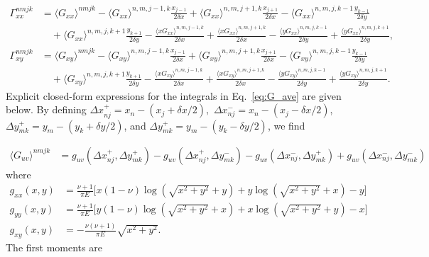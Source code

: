 \documentclass[aps,prl,reprint,groupedaddress,twocolumn]{revtex4-1}
\begin{document}
\begin{appendix}
\begin{align}
\Gamma_{xx}^{nmjk} & = \langle G_{xx} \rangle^{nmjk} - 
\langle G_{xx}\rangle^{n,m,j-1,k}\frac{x_{j-1}}{2\delta x}
+ \langle G_{xx} \rangle^{n,m,j+1,k}\frac{x_{j+1}}{2\delta x} 
-  \langle G_{xx} \rangle^{n,m,j,k-1}\frac{y_{k-1}}{2\delta y}  \nonumber\\
\: &\quad + \langle G_{xx} \rangle^{n,m,j,k+1}\frac{y_{k+1}}{2\delta y} 
-\frac{\langle xG_{xx} \rangle^{n,m,j-1,k}}{2\delta x}
+\frac{\langle xG_{xx} \rangle^{n,m,j+1,k}}{2\delta x} 
- \frac{\langle yG_{xx} \rangle^{n,m,j,k-1}}{2\delta y} 
+\frac{\langle yG_{xx} \rangle^{n,m,j,k+1}}{2\delta y}, 
\label{eq:linearsystemX}\tag{B3}
\end{align}
\begin{align}
\Gamma_{xy}^{nmjk} & =  \langle G_{xy} \rangle^{nmjk} 
- \langle G_{xy} \rangle^{n,m,j-1,k}\frac{x_{j-1}}{2\delta x}
+\langle G_{xy} \rangle^{n,m,j+1,k}\frac{x_{j+1}}{2\delta x} 
- \langle G_{xy} \rangle^{n,m,j,k-1}\frac{y_{k-1}}{2\delta y} \nonumber\\
\: & \quad+\langle G_{xy} \rangle^{n,m,j,k+1}\frac{y_{k+1}}{2\delta y}  
-\frac{\langle xG_{xy} \rangle^{n,m,j-1,k}}{2\delta x}+
\frac{\langle xG_{xy} \rangle^{n,m,j+1,k}}{2\delta x} 
- \frac{\langle yG_{xy} \rangle^{n,m,j,k-1}}{2\delta y} 
+\frac{\langle yG_{xy} \rangle^{n,m,j,k+1}}{2\delta y}.
\label{eq:linearsystemY}\tag{B4}
\end{align}
%
Explicit closed-form expressions for the integrals in
Eq.~\ref{eq:G_ave} are given below. By defining $\Delta x_{nj}^+ = x_n -
(x_j+\delta x/2),$ $\Delta x_{nj}^- = x_n - (x_j-\delta x/2)$, $\Delta
y_{mk}^+ = y_m - (y_k+\delta y/2)$, and $\Delta y_{mk}^+ = y_m -
(y_k-\delta y/2)$, we find

\begin{align}
\langle G_{uv}\rangle^{nmjk} &=   g_{uv}( \Delta x_{nj}^+,\Delta y_{mk}^+) - 
g_{uv}( \Delta x_{nj}^+,\Delta y_{mk}^-)
-g_{uv}(\Delta x_{nj}^-, \Delta y_{mk}^+) + g_{uv}(\Delta x_{nj}^- , \Delta y_{mk}^-)\tag{B5}
\end{align}
where
\begin{align}
g_{xx}(x,y) &= \frac{\nu+1}{\pi E}\Bigg[ x(1-\nu ) \log\left( \sqrt{x^2+y^2}+y\right)
+ y \log\left(\sqrt{x^2+y^2} +x\right)-y  \Bigg] \label{eq:fxx}\tag{B6} \\
g_{yy}(x,y) &= \frac{\nu+1}{\pi E}\Bigg[ y(1-\nu ) \log\left( \sqrt{x^2+y^2}+x\right)
+ x \log\left(\sqrt{x^2+y^2} +y\right)-x  \Bigg] \label{eq:fyy}\tag{B7} \\
g_{xy}(x,y) &= -\frac{\nu(\nu+1)}{\pi E}\sqrt{x^2+y^2}. \label{eq:fxy}\tag{B8}
\end{align}
%
The first moments are


\end{appendix}
\end{document}
